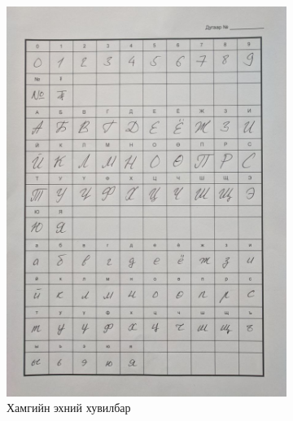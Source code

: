 \begin{figure}[ht]
	\begin{subfigure}{0.5\textwidth}
		\centering
		\includegraphics[width=0.9\linewidth]{images/sheet_1}
		\caption{Хамгийн эхний хувилбар}
		\label{fig:sheet_1}
	\end{subfigure}
	\begin{subfigure}{0.52\textwidth}
		\centering

\end{subfigure}
\end{figure}
